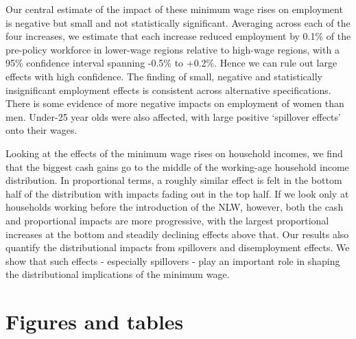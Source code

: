 Our central estimate of the impact of these minimum wage rises on employment is negative but small and not statistically significant. Averaging across each of the four increases, we estimate that each increase reduced employment by 0.1\% of the pre-policy workforce in lower-wage regions relative to high-wage regions, with a 95\% confidence interval spanning -0.5\% to +0.2\%. Hence we can rule out large effects with high confidence. The finding of small, negative and statistically insignificant employment effects is consistent across alternative specifications. There is some evidence of more negative impacts on employment of women than men. Under-25 year olds were also affected, with large positive `spillover effects' onto their wages.

Looking at the effects of the minimum wage rises on household incomes, we find that the biggest cash gains go to the middle of the working-age household income distribution. In proportional terms, a roughly similar effect is felt in the bottom half of the distribution with impacts fading out in the top half. If we look only at households working before the introduction of the NLW, however, both the cash and proportional impacts are more progressive, with the largest proportional increases at the bottom and steadily declining effects above that. Our results also quantify the distributional impacts from spillovers and disemployment effects. We show that such effects - especially spillovers - play an important role in shaping the distributional implications of the minimum wage.\par

\clearpage
\singlespacing
\setlength\bibsep{0pt}


\clearpage
\onehalfspacing

\section*{Figures and tables} \label{sec:fig}

